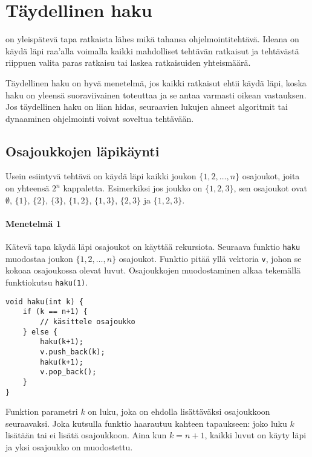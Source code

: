 \chapter{Täydellinen haku}

on yleispätevä tapa ratkaista
lähes mikä tahansa ohjelmointitehtävä.
Ideana on käydä läpi raa'alla voimalla kaikki
mahdolliset tehtävän ratkaisut ja tehtävästä riippuen
valita paras ratkaisu
tai laskea ratkaisuiden yhteismäärä.
          
Täydellinen haku on hyvä menetelmä, jos kaikki
ratkaisut ehtii käydä läpi,
koska haku on yleensä suoraviivainen toteuttaa
ja se antaa varmasti oikean vastauksen.
Jos täydellinen haku on liian hidas,
seuraavien lukujen ahneet algoritmit tai
dynaaminen ohjelmointi voivat soveltua
tehtävään.

\section{Osajoukkojen läpikäynti}


Usein esiintyvä tehtävä on käydä läpi
kaikki joukon $\{1,2,\ldots,n\}$ osajoukot,
joita on yhteensä $2^n$ kappaletta.
Esimerkiksi jos joukko on $\{1,2,3\}$,
sen osajoukot ovat $\emptyset$,
$\{1\}$, $\{2\}$, $\{3\}$,
$\{1,2\}$, $\{1,3\}$, $\{2,3\}$ ja $\{1,2,3\}$.

\subsubsection{Menetelmä 1}

Kätevä tapa käydä läpi osajoukot on
käyttää rekursiota.
Seuraava funktio \texttt{haku} muodostaa
joukon $\{1,2,\ldots,n\}$ osajoukot.
Funktio pitää yllä vektoria \texttt{v},
johon se kokoaa osajoukossa olevat luvut.
Osajoukkojen muodostaminen alkaa
tekemällä funktiokutsu \texttt{haku(1)}.

\begin{lstlisting}
void haku(int k) {
    if (k == n+1) {
        // käsittele osajoukko
    } else {
        haku(k+1);
        v.push_back(k);
        haku(k+1);
        v.pop_back();
    }
}
\end{lstlisting}

Funktion parametri $k$ on luku,
joka on ehdolla lisättäväksi osajoukkoon seuraavaksi.
Joka kutsulla funktio haarautuu kahteen tapaukseen:
joko luku $k$ lisätään tai ei lisätä osajoukkoon.
Aina kun $k=n+1$, kaikki luvut on käyty läpi
ja yksi osajoukko on muodostettu.

